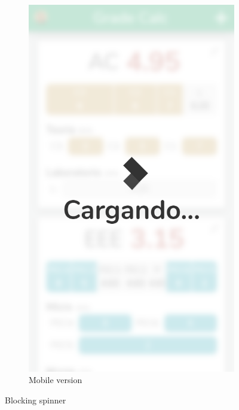 \begin{figure}[ht!]
\begin{subfigure}[b]{0.243\textwidth-0.1cm}
        \includegraphics[frame,width=\textwidth]{media/screenshots/screenshot-froozen.png}
        \caption{Mobile version}
    \end{subfigure}
    \caption{Blocking spinner}
    \label{fig:freeze}
\end{figure}

\vfill

